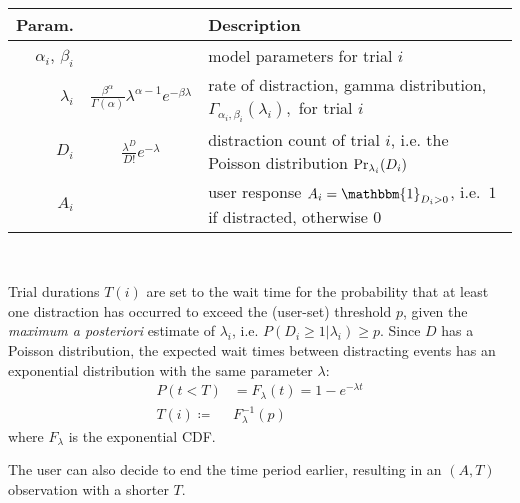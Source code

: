 \documentclass{article}
\begin{document}
{\centering
\begin{tabularx}{\linewidth-30pt}{r c X}
	\toprule
		\makecell{Param.\\} & \makecell{Definition} &Description\\
	\midrule
		$\alpha_i$, $\beta_i$ &  & model parameters for trial $i$\\
		$\lambda_i$& $\frac{\beta^{\alpha}}{\Gamma(\alpha)}\lambda^{\alpha-1}e^{-\beta\lambda}$&rate of distraction, gamma distribution, $\Gamma_{\alpha_i,\beta_i}(\lambda_i),$ for trial $i$\\
		$D_i$& $\frac{\lambda^D}{D!} e^{-\lambda}$ & distraction count of trial $i$, i.e. the Poisson distribution ${\rm Pr}_{\lambda_i}(D_i)$\\
		$A_i$ &  & user response $A_i=\mathbbm{1}_{D_i>0}$, i.e.\ $1$ if distracted, otherwise $0$\\
	\bottomrule
\end{tabularx}
\bigskip\\
\begin{minipage}{\linewidth-40pt}
	\centering
\end{minipage}
}
\bigskip

Trial durations $T(i)$ are set to the wait time for the probability that at least one distraction has occurred to exceed the (user-set) threshold $p$, given the \emph{maximum a posteriori} estimate of $\lambda_i$,  i.e. $P(D_i\geq 1|\lambda_i) \geq p$.  Since $D$ has a Poisson distribution, the expected wait times between distracting events has an exponential distribution with the same parameter $\lambda$:
\begin{align}
  P(t<T)&=F_{\lambda}(t)=1-e^{-\lambda  t}\nonumber\\
  T(i)\coloneqq& F_{\lambda}^{-1}\label{waittime}(p)
\end{align}
where $F_{\lambda}$ is the exponential CDF.  

The user can also decide to end the time period earlier, resulting in an $(A, T)$ observation with a shorter $T$.
\end{document}
